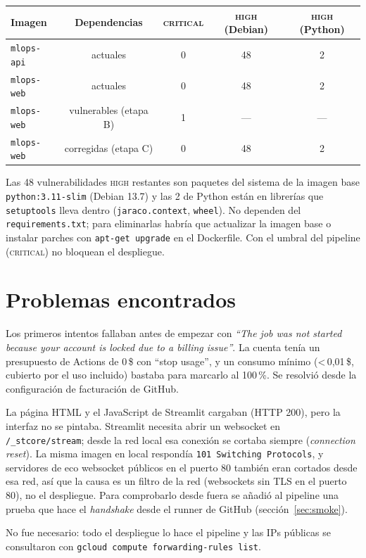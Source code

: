\documentclass[11pt,a4paper]{article}
\newcommand{\code}[1]{\texttt{#1}}
\begin{document}
\begin{center}
\begin{tabular}{lcccc}
\toprule
Imagen & Dependencias & \textsc{critical} & \textsc{high} (Debian) & \textsc{high} (Python) \\
\midrule
\code{mlops-api} & actuales & 0 & 48 & 2 \\
\code{mlops-web} & actuales & 0 & 48 & 2 \\
\code{mlops-web} & vulnerables (etapa B) & \textcolor{badred}{1} & --- & --- \\
\code{mlops-web} & corregidas (etapa C) & \textcolor{okgreen}{0} & 48 & 2 \\
\bottomrule
\end{tabular}
\end{center}

Las 48 vulnerabilidades \textsc{high} restantes son paquetes del sistema de la imagen base
\code{python:3.11-slim} (Debian 13.7) y las 2 de Python están en librerías que
\code{setuptools} lleva dentro (\code{jaraco.context}, \code{wheel}). No dependen del
\code{requirements.txt}; para eliminarlas habría que actualizar la imagen base o
instalar parches con \code{apt-get upgrade} en el Dockerfile. Con el umbral del
pipeline (\textsc{critical}) no bloquean el despliegue.

\section{Problemas encontrados}

\begin{description}[style=nextline]
  \item[GitHub Actions bloqueado por facturación]
    Los primeros intentos fallaban antes de empezar con
    \emph{``The job was not started because your account is locked due to a billing
    issue''}. La cuenta tenía un presupuesto de Actions de 0\,\$ con ``stop usage'', y
    un consumo mínimo (<\,0{,}01\,\$, cubierto por el uso incluido) bastaba para marcarlo
    al 100\,\%. Se resolvió desde la configuración de facturación de GitHub.
  \item[La web se queda cargando desde la red de la universidad]
    La página HTML y el JavaScript de Streamlit cargaban (HTTP 200), pero la interfaz no
    se pintaba. Streamlit necesita abrir un websocket en \code{/\_stcore/stream}; desde la
    red local esa conexión se cortaba siempre (\emph{connection reset}). La misma imagen en
    local respondía \code{101 Switching Protocols}, y servidores de eco websocket públicos
    en el puerto 80 también eran cortados desde esa red, así que la causa es un filtro de
    la red (websockets sin TLS en el puerto 80), no el despliegue. Para comprobarlo desde
    fuera se añadió al pipeline una prueba que hace el \emph{handshake} desde el runner de
    GitHub (sección~\ref{sec:smoke}).
  \item[\code{kubectl} local sin \code{gke-gcloud-auth-plugin}]
    No fue necesario: todo el despliegue lo hace el pipeline y las IPs públicas se
    consultaron con \code{gcloud compute forwarding-rules list}.
\end{description}
\end{document}
